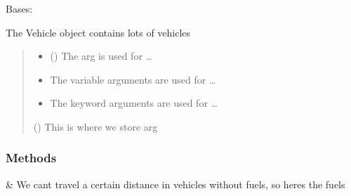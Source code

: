 \documentclass[letterpaper,10pt,english]{sphinxmanual}
\begin{document}
\begin{fulllineitems}
\label{\detokenize{_autosummary/module.dummycode.SphinxVehicle:module.dummycode.SphinxVehicle}}
\pysigstartsignatures
{}
\pysigstopsignatures
\sphinxAtStartPar
Bases: 

\sphinxAtStartPar
The Vehicle object contains lots of vehicles
\begin{quote}\begin{description}
\begin{itemize}
\item {} 
\sphinxAtStartPar
{} () \textendash{} The arg is used for …

\item {} 
\sphinxAtStartPar
{} \textendash{} The variable arguments are used for …

\item {} 
\sphinxAtStartPar
{} \textendash{} The keyword arguments are used for …

\end{itemize}

\sphinxAtStartPar
{} () \textendash{} This is where we store arg

\end{description}\end{quote}
\subsubsection*{Methods}


\begin{savenotes}\sphinxattablestart
\centering
\begin{tabulary}{\linewidth}[t]{}
\hline

\sphinxAtStartPar
{\hyperref[\detokenize{_autosummary/module.dummycode.SphinxVehicle:module.dummycode.SphinxVehicle.cars}]{}}
&
\sphinxAtStartPar
We can\textquotesingle{}t travel a certain distance in vehicles without fuels, so here\textquotesingle{}s the fuels
\\
\hline
\end{tabulary}
\par
\sphinxattableend\end{savenotes}


\end{fulllineitems}
\end{document}
